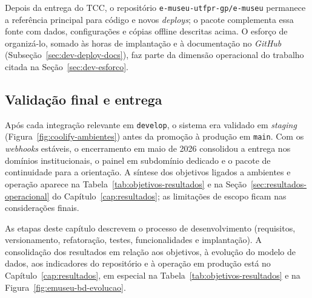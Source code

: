Depois da entrega do TCC, o repositório \texttt{e-museu-utfpr-gp/e-museu} permanece a referência principal para código e novos \textit{deploys}; o pacote complementa essa fonte com dados, configurações e cópias offline descritas acima. O esforço de organizá-lo, somado às horas de implantação e à documentação no \textit{GitHub} (Subseção~\ref{sec:dev-deploy-docs}), faz parte da dimensão operacional do trabalho citada na Seção~\ref{sec:dev-esforco}.


\subsection{Validação final e entrega}\label{sec:dev-deploy-entrega}

Após cada integração relevante em \texttt{develop}, o sistema era validado em \textit{staging} (Figura~\ref{fig:coolify-ambientes}) antes da promoção à produção em \texttt{main}. Com os \textit{webhooks} estáveis, o encerramento em maio de 2026 consolidou a entrega nos domínios institucionais, o painel em subdomínio dedicado e o pacote de continuidade para a orientação. A síntese dos objetivos ligados a ambientes e operação aparece na Tabela~\ref{tab:objetivos-resultados} e na Seção~\ref{sec:resultados-operacional} do Capítulo~\ref{cap:resultados}; as limitações de escopo ficam nas considerações finais.


As etapas deste capítulo descrevem o processo de desenvolvimento (requisitos, versionamento, refatoração, testes, funcionalidades e implantação). A consolidação dos resultados em relação aos objetivos, à evolução do modelo de dados, aos indicadores do repositório e à operação em produção está no Capítulo~\ref{cap:resultados}, em especial na Tabela~\ref{tab:objetivos-resultados} e na Figura~\ref{fig:emuseu-bd-evolucao}.

